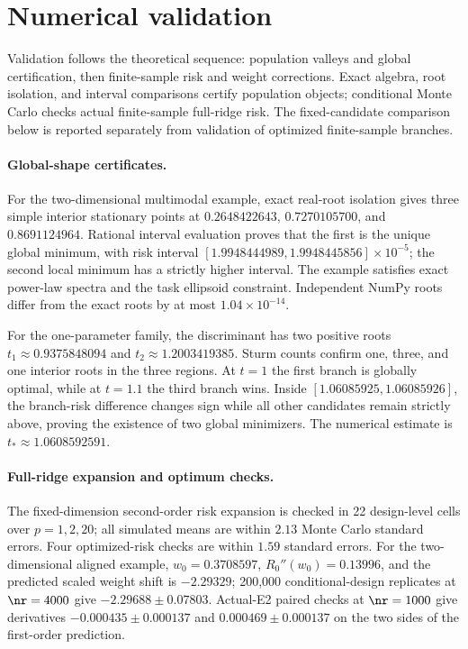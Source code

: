 \section{Numerical validation}
\label{sec:numerics}

Validation follows the theoretical sequence: population valleys and global certification, then finite-sample risk and weight corrections. Exact algebra, root isolation, and interval comparisons certify population objects; conditional Monte Carlo checks actual finite-sample full-ridge risk. The fixed-candidate comparison below is reported separately from validation of optimized finite-sample branches.

\paragraph{Global-shape certificates.}
For the two-dimensional multimodal example, exact real-root isolation gives three simple interior stationary points at $0.2648422643$, $0.7270105700$, and $0.8691124964$. Rational interval evaluation proves that the first is the unique global minimum, with risk interval $[1.9948444989,1.9948445856]\times10^{-5}$; the second local minimum has a strictly higher interval. The example satisfies exact power-law spectra and the task ellipsoid constraint. Independent NumPy roots differ from the exact roots by at most $1.04\times10^{-14}$.

For the one-parameter family, the discriminant has two positive roots $t_1\approx0.9375848094$ and $t_2\approx1.2003419385$. Sturm counts confirm one, three, and one interior roots in the three regions. At $t=1$ the first branch is globally optimal, while at $t=1.1$ the third branch wins. Inside $[1.06085925,1.06085926]$, the branch-risk difference changes sign while all other candidates remain strictly above, proving the existence of two global minimizers. The numerical estimate is $t_*\approx1.0608592591$.

\paragraph{Full-ridge expansion and optimum checks.}
The fixed-dimension second-order risk expansion is checked in 22 design-level cells over $p=1,2,20$; all simulated means are within $2.13$ Monte Carlo standard errors. Four optimized-risk checks are within $1.59$ standard errors. For the two-dimensional aligned example, $w_0=0.3708597$, $R_0''(w_0)=0.13996$, and the predicted scaled weight shift is $-2.29329$; 200{,}000 conditional-design replicates at $\nr=4000$ give $-2.29688\pm0.07803$. Actual-E2 paired checks at $\nr=1000$ give derivatives $-0.000435\pm0.000137$ and $0.000469\pm0.000137$ on the two sides of the first-order prediction.

